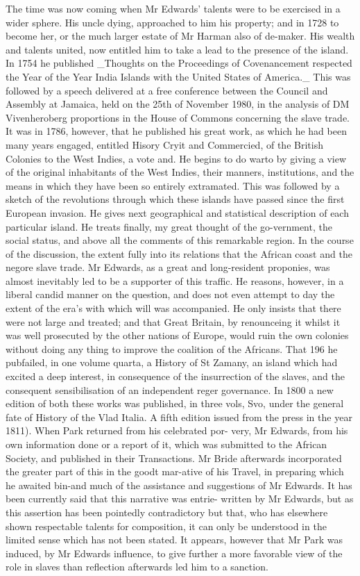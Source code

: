 \documentclass{article}
\begin{document}
The time was now coming when Mr Edwards’ talents were to be exercised in a wider sphere. His uncle dying, approached to him his property; and in 1728 to become her, or the much larger estate of Mr Harman also of de-maker. His wealth and talents united, now entitled him to take a lead to the presence of the island. In 1754 he published \_Thoughts on the Proceedings of Covenancement respected the Year of the Year India Islands with the United States of America.\_ This was followed by a speech delivered at a free conference between the Council and Assembly at Jamaica, held on the 25th of November 1980, in the analysis of DM Vivenheroberg proportions in the House of Commons concerning the slave trade. It was in 1786, however, that he published his great work, as which he had been many years engaged, entitled Hisory Cryit and Commercied, of the British Colonies to the West Indies, a vote and. He begins to do warto by giving a view of the original inhabitants of the West Indies, their manners, institutions, and the means in which they have been so entirely extramated. This was followed by a sketch of the revolutions through which these islands have passed since the first European invasion. He gives next geographical and statistical description of each particular island. He treats finally, my great thought of the go-vernment, the social status, and above all the comments of this remarkable region. In the course of the discussion, the extent fully into its relations that the African coast and the negore slave trade. Mr Edwards, as a great and long-resident proponies, was almost inevitably led to be a supporter of this traffic. He reasons, however, in a liberal candid manner on the question, and does not even attempt to day the extent of the era's with which will was accompanied. He only insists that there were not large and treated; and that Great Britain, by renounceing it whilst it was well prosecuted by the other nations of Europe, would ruin the own colonies without doing any thing to improve the coalition of the Africans. That 196 he pub­failed, in one volume quarta, a History of St Zamany, an island which had excited a deep interest, in consequence of the insurrection of the slaves, and the consequent sensibilisation of an independent reger governance. In 1800 a new edition of both these works was published, in three vols, Svo, under the general fate of History of the Vlad Italia. A fifth edition issued from the press in the year 1811). When Park returned from his celebrated por- very, Mr Edwards, from his own information done or a report of it, which was submitted to the African Society, and published in their Transactions. Mr Bride afterwards incorporated the greater part of this in the goodt mar-ative of his Travel, in preparing which he awaited bin-and much of the assistance and suggestions of Mr Edwards. It has been currently said that this narrative was entrie- written by Mr Edwards, but as this assertion has been pointedly contradictory but that, who has elsewhere shown respectable talents for composition, it can only be understood in the limited sense which has not been stated. It appears, however that Mr Park was induced, by Mr Edwards influence, to give further a more favorable view of the role in slaves than reflection afterwards led him to a sanction.
\end{document}
